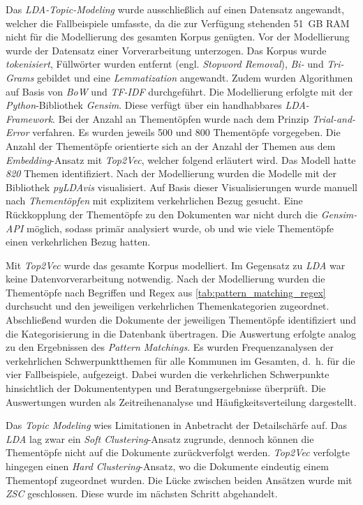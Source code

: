 Das \textit{LDA-Topic-Modeling} wurde ausschließlich auf einen Datensatz angewandt, welcher die Fallbeispiele umfasste, da die zur Verfügung stehenden 51~GB RAM nicht für die Modellierung des gesamten Korpus genügten. Vor der Modellierung wurde der Datensatz einer Vorverarbeitung unterzogen. Das Korpus wurde \textit{tokenisiert}, Füllwörter wurden entfernt (engl. \textit{Stopword Removal}), \textit{Bi-} und \textit{Tri-Grams} gebildet und eine \textit{Lemmatization} angewandt. Zudem wurden Algorithmen auf Basis von \textit{BoW} und \textit{TF-IDF} durchgeführt. Die Modellierung erfolgte mit der \textit{Python}-Bibliothek \textit{Gensim}. Diese verfügt über ein handhabbares \textit{LDA-Framework}. Bei der Anzahl an Thementöpfen wurde nach dem Prinzip \textit{Trial-and-Error} verfahren. Es wurden jeweils 500 und 800 Thementöpfe vorgegeben. Die Anzahl der Thementöpfe orientierte sich an der Anzahl der Themen aus dem \textit{Embedding}-Ansatz mit \textit{Top2Vec}, welcher folgend erläutert wird. Das Modell hatte \textit{820} Themen identifiziert. Nach der Modellierung wurden die Modelle mit der Bibliothek \textit{pyLDAvis} visualisiert. Auf Basis dieser Visualisierungen wurde manuell nach \textit{Thementöpfen} mit explizitem verkehrlichen Bezug gesucht. Eine Rückkopplung der Thementöpfe zu den Dokumenten war nicht durch die \textit{Gensim-API} möglich, sodass primär analysiert wurde, ob und wie viele Thementöpfe einen verkehrlichen Bezug hatten.

Mit \textit{Top2Vec} wurde das gesamte Korpus modelliert. Im Gegensatz zu \textit{LDA} war keine Datenvorverarbeitung notwendig. Nach der Modellierung wurden die Thementöpfe nach Begriffen und Regex aus \autoref{tab:pattern_matching_regex} durchsucht und den jeweiligen verkehrlichen Themenkategorien zugeordnet. Abschließend wurden die Dokumente der jeweiligen Thementöpfe identifiziert und die Kategorisierung in die Datenbank übertragen. Die Auswertung erfolgte analog zu den Ergebnissen des \textit{Pattern Matchings}. Es wurden Frequenzanalysen der verkehrlichen Schwerpunktthemen für alle Kommunen im Gesamten, d.~h. für die vier Fallbeispiele, aufgezeigt. Dabei wurden die verkehrlichen Schwerpunkte hinsichtlich der Dokumententypen und Beratungsergebnisse überprüft. Die Auswertungen wurden als Zeitreihenanalyse und Häufigkeitsverteilung dargestellt.

Das \textit{Topic Modeling} wies Limitationen in Anbetracht der Detailschärfe auf. Das \textit{LDA} lag zwar ein \textit{Soft Clustering}-Ansatz zugrunde, dennoch können die Thementöpfe nicht auf die Dokumente zurückverfolgt werden. \textit{Top2Vec} verfolgte hingegen einen \textit{Hard Clustering}-Ansatz, wo die Dokumente eindeutig einem Thementopf zugeordnet wurden. Die Lücke zwischen beiden Ansätzen wurde mit \textit{ZSC} geschlossen. Diese wurde im nächsten Schritt abgehandelt.

